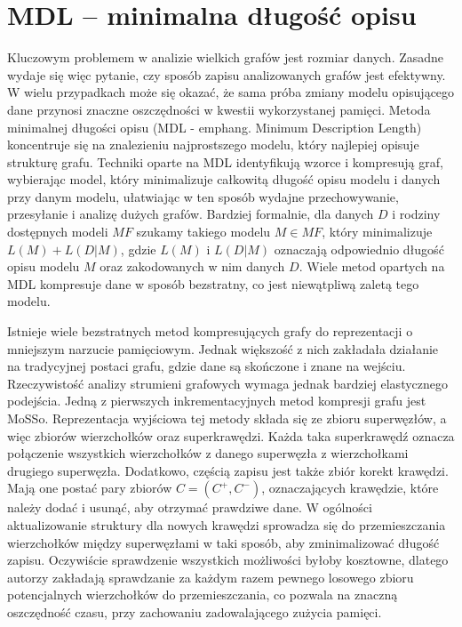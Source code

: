\section{MDL -- minimalna długość opisu}
    Kluczowym problemem w analizie wielkich grafów jest rozmiar danych. Zasadne wydaje się więc pytanie, czy sposób zapisu analizowanych grafów jest efektywny. W wielu przypadkach może się okazać, że sama próba zmiany modelu opisującego dane przynosi znaczne oszczędności w kwestii wykorzystanej pamięci. Metoda minimalnej długości opisu (MDL - emph{ang. Minimum Description Length}) koncentruje się na znalezieniu najprostszego modelu, który najlepiej opisuje strukturę grafu. Techniki oparte na MDL identyfikują wzorce i kompresują graf, wybierając model, który minimalizuje całkowitą długość opisu modelu i danych przy danym modelu, ułatwiając w ten sposób wydajne przechowywanie, przesyłanie i analizę dużych grafów. Bardziej formalnie, dla danych $D$ i rodziny dostępnych modeli $MF$ szukamy takiego modelu $M \in MF$, który minimalizuje $L(M) + L(D|M)$, gdzie $L(M)$ i $L(D|M)$ oznaczają odpowiednio długość opisu modelu $M$ oraz zakodowanych w nim danych $D$. Wiele metod opartych na MDL kompresuje dane w sposób bezstratny, co jest niewątpliwą zaletą tego modelu. 

    Istnieje wiele bezstratnych metod kompresujących grafy do reprezentacji o mniejszym narzucie pamięciowym. Jednak większość z nich zakładała działanie na tradycyjnej postaci grafu, gdzie  dane są skończone i znane na wejściu. Rzeczywistość analizy strumieni grafowych wymaga jednak bardziej elastycznego podejścia. Jedną z pierwszych inkrementacyjnych metod kompresji grafu jest MoSSo\cite{Ko_Kook_Shin_2020}. Reprezentacja wyjściowa tej metody składa się ze zbioru superwęzłów, a więc zbiorów wierzchołków oraz superkrawędzi. Każda taka superkrawędź oznacza połączenie wszystkich wierzchołków z danego superwęzła z wierzchołkami drugiego superwęzła. Dodatkowo, częścią zapisu jest także zbiór korekt krawędzi. Mają one postać pary zbiorów $C = (C^{+}, C^{-})$, oznaczających krawędzie, które należy dodać i usunąć, aby otrzymać prawdziwe dane. W ogólności aktualizowanie struktury dla nowych krawędzi sprowadza się do przemieszczania wierzchołków między superwęzłami w taki sposób, aby zminimalizować długość zapisu. Oczywiście sprawdzenie wszystkich możliwości byłoby kosztowne, dlatego autorzy zakładają sprawdzanie za każdym razem pewnego losowego zbioru potencjalnych wierzchołków do przemieszczania, co pozwala na znaczną oszczędność czasu, przy zachowaniu zadowalającego zużycia pamięci.

